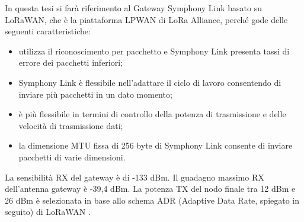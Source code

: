 \documentclass[a4paper]{report} %
\begin{document}
In questa tesi si farà riferimento al Gateway Symphony Link basato su LoRaWAN, che è la piattaforma LPWAN di LoRa Alliance, perché gode delle seguenti caratteristiche:
\begin{itemize}
\item utilizza il riconoscimento per pacchetto e Symphony Link presenta tassi di errore dei pacchetti inferiori;
\item Symphony Link è flessibile nell'adattare il ciclo di lavoro consentendo di inviare più pacchetti in un dato momento;
\item è più flessibile in termini di controllo della potenza di trasmissione e delle velocità di trasmissione dati;
\item la dimensione MTU fissa di 256 byte di Symphony Link consente di inviare pacchetti di varie dimensioni.
\end{itemize}
La sensibilità RX del gateway è di -133 dBm. Il guadagno massimo RX dell'antenna gateway è -39,4 dBm. La potenza TX del nodo finale tra 12 dBm e 26 dBm è selezionata in base allo schema ADR (Adaptive Data Rate, spiegato in seguito) di LoRaWAN \cite{art:rif.47}. 
\end{document}
